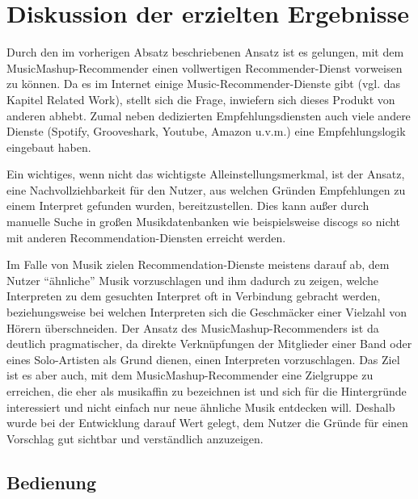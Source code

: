\section{Diskussion der erzielten Ergebnisse}


Durch den im vorherigen Absatz beschriebenen Ansatz ist es gelungen, mit dem MusicMashup-Recommender einen vollwertigen Recommender-Dienst vorweisen zu können. Da es im Internet einige Music-Recommender-Dienste gibt (vgl. das Kapitel Related Work), stellt sich die Frage, inwiefern sich dieses Produkt von anderen abhebt. Zumal neben dedizierten Empfehlungsdiensten auch viele andere Dienste (Spotify, Grooveshark, Youtube, Amazon u.v.m.)  eine Empfehlungslogik eingebaut haben.

Ein wichtiges, wenn nicht das wichtigste Alleinstellungsmerkmal, ist der Ansatz, eine Nachvollziehbarkeit für den Nutzer, aus welchen Gründen Empfehlungen zu einem Interpret gefunden wurden, bereitzustellen. Dies kann außer durch manuelle Suche in großen Musikdatenbanken wie beispielsweise discogs so nicht mit anderen Recommendation-Diensten erreicht werden.

Im Falle von Musik zielen Recommendation-Dienste meistens darauf ab, dem Nutzer “ähnliche” Musik vorzuschlagen und ihm dadurch zu zeigen, welche Interpreten zu dem gesuchten Interpret oft in Verbindung gebracht werden, beziehungsweise bei welchen Interpreten sich die Geschmäcker einer Vielzahl von Hörern überschneiden.
Der Ansatz des MusicMashup-Recommenders ist da deutlich pragmatischer, da direkte Verknüpfungen der Mitglieder einer Band oder eines Solo-Artisten als Grund dienen, einen Interpreten vorzuschlagen.
Das Ziel ist es aber auch, mit dem MusicMashup-Recommender eine Zielgruppe zu erreichen, die eher als musikaffin zu bezeichnen ist und sich für die Hintergründe interessiert und nicht einfach nur neue ähnliche Musik entdecken will. Deshalb wurde bei der Entwicklung darauf Wert gelegt, dem Nutzer die Gründe für einen Vorschlag gut sichtbar und verständlich anzuzeigen.

\subsection{Bedienung}

